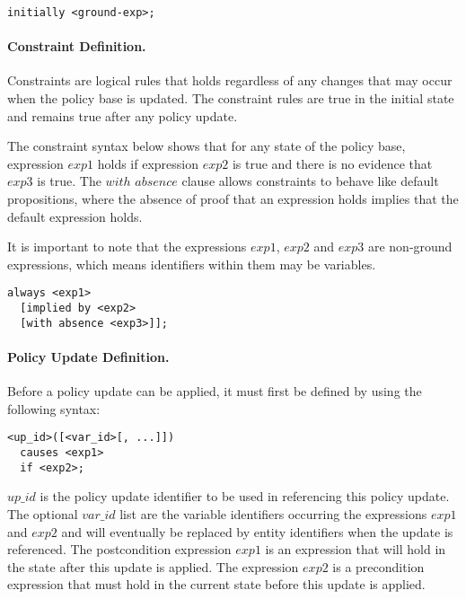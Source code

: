 \documentclass[10pt, twocolumn]{article}
\begin{document}
          \begin{verbatim}initially <ground-exp>;\end{verbatim}

        \paragraph{Constraint Definition.}

          Constraints are logical rules that holds regardless of any changes
          that may occur when the policy base is updated. The constraint rules
          are true in the initial state and remains true after any policy
          update.

          The constraint syntax below shows that for any state of the policy
          base, expression $exp1$ holds if expression $exp2$ is true and there
          is no evidence that $exp3$ is true. The $with$ $absence$ clause
          allows constraints to behave like default propositions, where the
          absence of proof that an expression holds implies that the default
          expression holds.

          It is important to note that the expressions $exp1$, $exp2$ and
          $exp3$ are non-ground expressions, which means identifiers within
          them may be variables.

          \begin{verbatim}
always <exp1>
  [implied by <exp2>
  [with absence <exp3>]];
          \end{verbatim}

        \paragraph{Policy Update Definition.}

          Before a policy update can be applied, it must first be defined by
          using the following syntax:

          \begin{verbatim}
<up_id>([<var_id>[, ...]])
  causes <exp1>
  if <exp2>;
          \end{verbatim}

          $up\_id$ is the policy update identifier to be used in referencing
          this policy update. The optional $var\_id$ list are the variable
          identifiers occurring the expressions $exp1$ and $exp2$ and will
          eventually be replaced by entity identifiers when the update is
          referenced. The postcondition expression $exp1$ is an expression that
          will hold in the state after this update is applied. The expression
          $exp2$ is a precondition expression that must hold in the current
          state before this update is applied.
\end{document}
